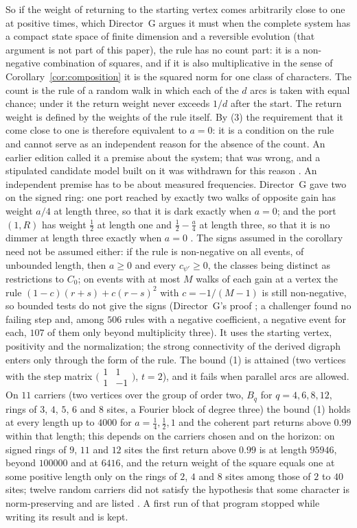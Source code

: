 So if the weight of returning to the starting vertex comes arbitrarily close to one at positive times, which Director~G argues it must when the complete system has a compact state space of finite dimension and a reversible evolution \cite{dgret} (that argument is not part of this paper), the rule has no count part: it is a non-negative combination of squares, and if it is also multiplicative in the sense of Corollary~\ref{cor:composition} it is the squared norm for one class of characters. The count is the rule of a random walk in which each of the $d$ arcs is taken with equal chance; under it the return weight never exceeds $1/d$ after the start. The return weight is defined by the weights of the rule itself. By (3) the requirement that it come close to one is therefore equivalent to $a=0$: it is a condition on the rule and cannot serve as an independent reason for the absence of the count. An earlier edition called it a premise about the system; that was wrong, and a stipulated candidate model built on it was withdrawn for this reason \cite{comp4s}. An independent premise has to be about measured frequencies. Director~G gave two on the signed ring: one port reached by exactly two walks of opposite gain has weight $a/4$ at length three, so that it is dark exactly when $a=0$; and the port $(1,R)$ has weight $\tfrac12$ at length one and $\tfrac12-\tfrac a4$ at length three, so that it is no dimmer at length three exactly when $a=0$ \cite{dgz1}. The signs assumed in the corollary need not be assumed either: if the rule is non-negative on all events, of unbounded length, then $a\ge0$ and every $c_{\psi'}\ge0$, the classes being distinct as restrictions to $C_0$; on events with at most $M$ walks of each gain at a vertex the rule $(1-c)(r+s)+c(r-s)^2$ with $c=-1/(M-1)$ is still non-negative, so bounded tests do not give the signs (Director~G's proof \cite{dgz1}; a challenger found no failing step and, among $506$ rules with a negative coefficient, a negative event for each, $107$ of them only beyond multiplicity three). It uses the starting vertex, positivity and the normalization; the strong connectivity of the derived digraph enters only through the form of the rule. The bound (1) is attained (two vertices with the step matrix $\bigl(\begin{smallmatrix}1&1\\1&-1\end{smallmatrix}\bigr)$, $t=2$), and it fails when parallel arcs are allowed. On $11$ carriers (two vertices over the group of order two, $B_q$ for $q=4,6,8,12$, rings of $3$, $4$, $5$, $6$ and $8$ sites, a Fourier block of degree three) the bound (1) holds at every length up to $4000$ for $a=\tfrac14,\tfrac12,1$ and the coherent part returns above $0.99$ within that length; this depends on the carriers chosen and on the horizon: on signed rings of $9$, $11$ and $12$ sites the first return above $0.99$ is at length $95946$, beyond $100000$ and at $6416$, and the return weight of the square equals one at some positive length only on the rings of $2$, $4$ and $8$ sites among those of $2$ to $40$ sites; twelve random carriers did not satisfy the hypothesis that some character is norm-preserving and are listed \cite{comp4s}. A first run of that program stopped while writing its result and is kept.
